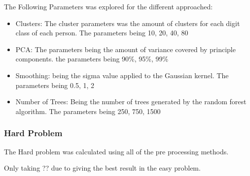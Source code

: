 \documentclass[report]{subfiles}
\begin{document}
The Following Parameters was explored for the different approached:
\begin{itemize}
\item Clusters: The cluster parameters was the amount of clusters for each digit class of each person. The parameters being {10, 20, 40, 80}
\item PCA: The parameters being the amount of variance covered by principle components. the parameters being {90\%, 95\%, 99\%}
\item Smoothing: being the sigma value applied to the Gaussian kernel. The parameters being {0.5, 1, 2}
\item Number of Trees: Being the number of trees generated by the random forest algorithm. The parameters being {250, 750, 1500}
\end{itemize}

\subsubsection{Hard Problem}
The Hard problem was calculated using all of the pre processing methods.

Only taking ?? due to giving the best result in the easy problem.
\end{document}
